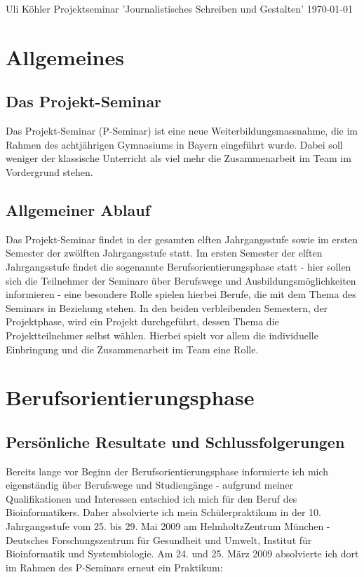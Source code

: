 \documentclass[a4paper,12pt,oneside]{scrbook}
\begin{document}
\begin{titlepage}
\begin{center}
\fontsize{14pt}{14pt}\selectfont
\vspace*{\fill}{\large Ernst-Mach-Gymnasium Haar}
\vfill {{\Huge \bfseries {}}}
\vfill {\large Uli Köhler}
\vfill {\large Projektseminar 'Journalistisches Schreiben und Gestalten'}
\vfill {\today}
\end{center}\vspace*{\fill}	
\end{titlepage}
\tableofcontents
\newpage
\chapter{Allgemeines}
\section{Das Projekt-Seminar}
Das Projekt-Seminar (P-Seminar) ist eine neue Weiterbildungsmassnahme, die im Rahmen des achtjährigen Gymnasiums in Bayern eingeführt wurde.
Dabei soll weniger der klassische Unterricht als viel mehr die Zusammenarbeit im Team im Vordergrund stehen.
\section{Allgemeiner Ablauf}
Das Projekt-Seminar findet in der gesamten elften Jahrgangsstufe sowie im ersten Semester der zwölften Jahrgangsstufe statt.
Im ersten Semester der elften Jahrgangsstufe findet die sogenannte Berufsorientierungsphase statt - hier sollen sich die Teilnehmer der Seminare über Berufswege und Ausbildungsmöglichkeiten informieren -
eine besondere Rolle spielen hierbei Berufe, die mit dem Thema des Seminars in Beziehung stehen.
In den beiden verbleibenden Semestern, der Projektphase, wird ein Projekt durchgeführt, dessen Thema die Projektteilnehmer selbst wählen.
Hierbei spielt vor allem die individuelle Einbringung und die Zusammenarbeit im Team eine Rolle.
\chapter{Berufsorientierungsphase}
\section{Persönliche Resultate und Schlussfolgerungen}
Bereits lange vor Beginn der Berufsorientierungsphase informierte ich mich eigenständig über Berufswege und Studiengänge - aufgrund meiner Qualifikationen und Interessen entschied ich mich für den Beruf des Bioinformatikers.
Daher absolvierte ich mein Schülerpraktikum in der 10. Jahrgangsstufe vom 25. bis 29. Mai 2009 am HelmholtzZentrum München - Deutsches Forschungszentrum für Gesundheit und Umwelt, Institut für Bioinformatik und Systembiologie.
Am 24. und 25. März 2009 absolvierte ich dort im Rahmen des P-Seminars erneut ein Praktikum:
\end{document}
